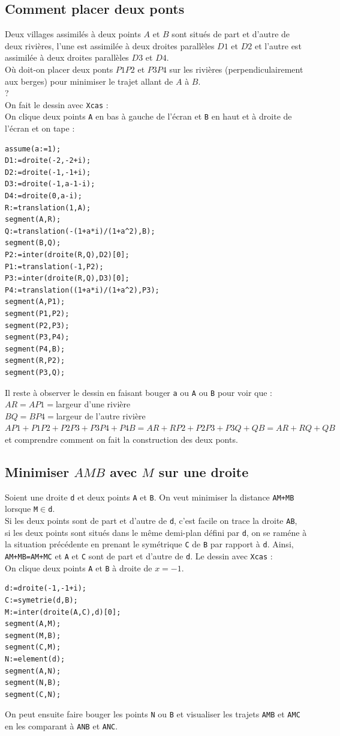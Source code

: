 \documentclass[a4paper,11pt]{book}
\begin{document}
\subsection{Comment placer deux ponts}
Deux villages assimil\'es \`a deux points $A$ et $B$ sont situ\'es de part et 
d'autre de deux rivi\`eres, l'une est  assimil\'ee \`a deux droites 
parall\`eles $D1$ et $D2$ et l'autre est  assimil\'ee \`a deux droites 
parall\`eles $D3$ et $D4$.\\
O\`u doit-on placer deux ponts $P1P2$ et $P3P4$  sur les rivi\`eres 
(perpendiculairement aux berges) pour minimiser le trajet allant de $A$ \`a 
$B$.\\ ?\\
On fait le dessin avec {\tt Xcas} :\\
On clique deux points {\tt A} en bas \`a gauche  de l'\'ecran et {\tt B} 
en haut et \`a droite de l'\'ecran et on tape :\\
\begin{verbatim}
assume(a:=1);
D1:=droite(-2,-2+i);
D2:=droite(-1,-1+i);
D3:=droite(-1,a-1-i);
D4:=droite(0,a-i);
R:=translation(1,A);
segment(A,R);
Q:=translation(-(1+a*i)/(1+a^2),B);
segment(B,Q);
P2:=inter(droite(R,Q),D2)[0];
P1:=translation(-1,P2);
P3:=inter(droite(R,Q),D3)[0];
P4:=translation((1+a*i)/(1+a^2),P3);
segment(A,P1);
segment(P1,P2);
segment(P2,P3);
segment(P3,P4);
segment(P4,B);
segment(R,P2);
segment(P3,Q);
\end{verbatim}
Il reste \`a observer le dessin en faisant bouger {\tt a} ou {\tt A}
ou {\tt B} pour voir que :\\
$AR=AP1=$largeur d'une rivi\`ere\\
$BQ=BP4=$largeur de l'autre rivi\`ere\\
$AP1+P1P2+P2P3+P3P4+P4B=AR+RP2+P2P3+P3Q+QB=AR+RQ+QB$\\
 et comprendre comment on fait la construction des deux ponts. 
\subsection{Minimiser $AMB$  avec $M$ sur une droite}
Soient une droite {\tt d} et deux points {\tt A} et {\tt B}. On veut 
minimiser la distance {\tt AM+MB} lorsque {\tt M}$\in${\tt d}.\\
Si les deux points sont de part et d'autre de {\tt d}, c'est facile on trace 
la droite {\tt AB},\\
si les deux points sont  situ\'es 
dans le m\^eme demi-plan d\'efini par {\tt d}, on se ram\'ene \` a la 
situation pr\'ec\'edente en prenant le sym\'etrique {\tt C} de {\tt B} par
rapport \`a {\tt d}. 
Ainsi, {\tt AM+MB=AM+MC} et {\tt A} et {\tt C} sont de part et d'autre 
de {\tt d}.
Le dessin avec {\tt Xcas} :\\
On clique deux points {\tt A} et {\tt B} \`a droite 
de $x=-1$.
\begin{verbatim}
d:=droite(-1,-1+i);
C:=symetrie(d,B);
M:=inter(droite(A,C),d)[0];
segment(A,M);
segment(M,B);
segment(C,M);
N:=element(d);
segment(A,N);
segment(N,B);
segment(C,N);
\end{verbatim}
On peut ensuite faire bouger les points {\tt N} ou {\tt B} et visualiser les 
trajets {\tt AMB} et {\tt AMC} en les comparant \`a {\tt ANB} et {\tt ANC}.  
\end{document}
